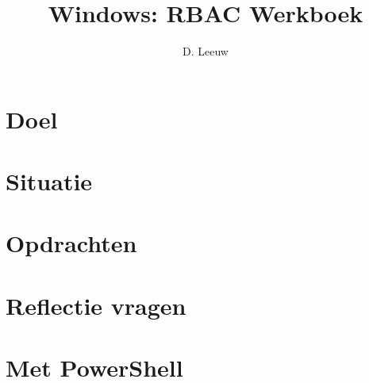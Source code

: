 \documentclass[a4paper,12pt,twoside,titlepage]{article}
\author{D. Leeuw}
\title{Windows: RBAC Werkboek}
\date{\today\\
0.0.0
\vfill
\raggedright
\copyright\ 2026 Dennis Leeuw\\
}
\begin{document}

\maketitle



\section{Doel}


\section{Situatie}


\section{Opdrachten}


\section{Reflectie vragen}


\section{Met PowerShell}


\printindex
\end{document}
